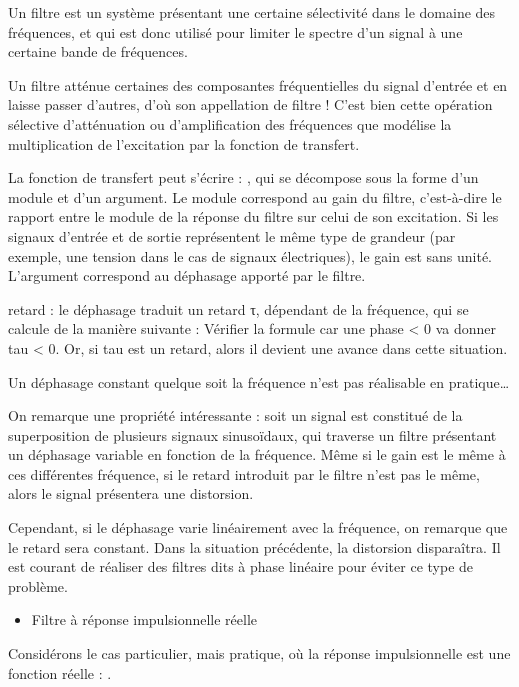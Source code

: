 \documentclass[]{article}
\begin{document}
Un filtre est un système présentant une certaine sélectivité dans le
domaine des fréquences, et qui est donc utilisé pour limiter le spectre
d'un signal à une certaine bande de fréquences.

Un filtre atténue certaines des composantes fréquentielles du signal
d'entrée et en laisse passer d'autres, d'où son appellation de filtre !
C'est bien cette opération sélective d'atténuation ou d'amplification
des fréquences que modélise la multiplication de l'excitation par la
fonction de transfert.

La fonction de transfert peut s'écrire : , qui se décompose sous la
forme d'un module et d'un argument. Le module correspond au gain du
filtre, c'est-à-dire le rapport entre le module de la réponse du filtre
sur celui de son excitation. Si les signaux d'entrée et de sortie
représentent le même type de grandeur (par exemple, une tension dans le
cas de signaux électriques), le gain est sans unité. L'argument
correspond au déphasage apporté par le filtre.

retard : le déphasage traduit un retard τ, dépendant de la fréquence,
qui se calcule de la manière suivante : Vérifier la formule car une
phase \textless{} 0 va donner tau \textless{} 0. Or, si tau est un
retard, alors il devient une avance dans cette situation.

Un déphasage constant quelque soit la fréquence n'est pas réalisable en
pratique\ldots{}

On remarque une propriété intéressante : soit un signal est constitué de
la superposition de plusieurs signaux sinusoïdaux, qui traverse un
filtre présentant un déphasage variable en fonction de la fréquence.
Même si le gain est le même à ces différentes fréquence, si le retard
introduit par le filtre n'est pas le même, alors le signal présentera
une distorsion.

Cependant, si le déphasage varie linéairement avec la fréquence, on
remarque que le retard sera constant. Dans la situation précédente, la
distorsion disparaîtra. Il est courant de réaliser des filtres dits à
phase linéaire pour éviter ce type de problème.

\begin{itemize}
\itemsep1pt\parskip0pt
\item
  Filtre à réponse impulsionnelle réelle
\end{itemize}

Considérons le cas particulier, mais pratique, où la réponse
impulsionnelle est une fonction réelle : .
\end{document}
